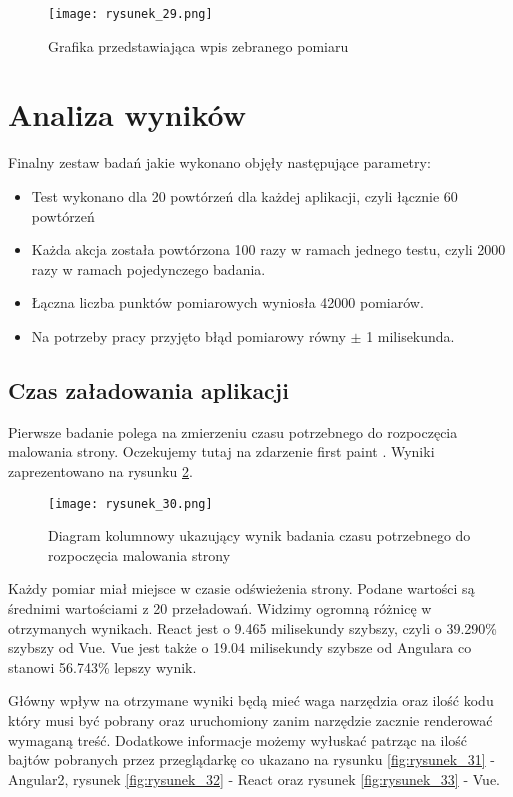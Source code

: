\begin{figure}[!ht]
    \centering
    \texttt{[image: rysunek\_29.png]}
    \caption{Grafika przedstawiająca wpis zebranego pomiaru}
    \label{fig:rysunek_29}
\end{figure}


\section{Analiza wyników}

Finalny zestaw badań jakie wykonano objęły następujące parametry:
\begin{itemize}
    \item Test wykonano dla 20 powtórzeń dla każdej aplikacji, czyli łącznie 60 powtórzeń
    \item Każda akcja została powtórzona 100 razy w ramach jednego testu, czyli 2000 razy w ramach pojedynczego badania.
    \item Łączna liczba punktów pomiarowych wyniosła 42000 pomiarów.
    \item Na potrzeby pracy przyjęto błąd pomiarowy równy $\pm$ 1 milisekunda.
\end{itemize}

\subsection{Czas załadowania aplikacji}

Pierwsze badanie polega na zmierzeniu czasu potrzebnego do rozpoczęcia malowania strony. Oczekujemy tutaj na zdarzenie first paint \cite{mdn-first-paint}.
Wyniki zaprezentowano na rysunku \ref{fig:rysunek_30}.

\begin{figure}[!ht]
    \centering
    \texttt{[image: rysunek\_30.png]}
    \caption{Diagram kolumnowy ukazujący wynik badania czasu potrzebnego do rozpoczęcia malowania strony}
    \label{fig:rysunek_30}
\end{figure}

Każdy pomiar miał miejsce w czasie odświeżenia strony.
Podane wartości są średnimi wartościami z 20 przeładowań.
Widzimy ogromną różnicę w otrzymanych wynikach. React jest o 9.465 milisekundy szybszy, czyli o 39.290\% szybszy od Vue.
Vue jest także o 19.04 milisekundy szybsze od Angulara co stanowi 56.743\% lepszy wynik.

Główny wpływ na otrzymane wyniki będą mieć waga narzędzia oraz ilość kodu który musi być pobrany oraz uruchomiony zanim narzędzie zacznie renderować wymaganą treść.
Dodatkowe informacje możemy wyłuskać patrząc na ilość bajtów pobranych przez przeglądarkę co ukazano na rysunku \ref{fig:rysunek_31} - Angular2, rysunek \ref{fig:rysunek_32} - React oraz rysunek \ref{fig:rysunek_33} - Vue.

